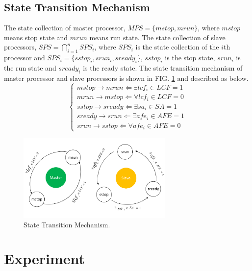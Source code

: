 \documentclass[journal,UTF8]{IEEEtran}
\begin{document}
 \subsection{State Transition Mechanism}
 The state collection of master processor, $MPS = \{mstop, mrun\}$, where $mstop$ means stop state and $mrun$ means run state. The state collection of slave processors, $SPS = \bigcap_{i=1}^{n} SPS_{i}$, where $SPS_{i}$ is the state collection of the $i$th processor and $SPS_{i} = \{sstop_{i}, srun_{i}, sready_{i}\}$, $sstop_{i}$ is the stop state, $srun_{i}$ is the run state and $sready_{i}$ is the ready state. The state transition mechanism of master processor and slave processors is shown in FIG. \ref{fig:state} and described as below.
\begin{equation}
\left\{
\begin{array}{l}
 mstop \to mrun \Leftarrow\exists lcf_i \in LCF = 1\\
 mrun \to mstop \Leftarrow\forall lcf_i \in LCF = 0\\
 sstop \to sready \Leftarrow\exists sa_{i} \in SA = 1\\
 sready \to srun \Leftarrow\exists afe_{i}\in AFE = 1\\
 srun \to sstop \Leftarrow\forall afe_{i}\in AFE = 0
\end{array}
\right.
\end{equation}

 \begin{figure}
	\centering
	\includegraphics[width=3in]{fig/state.pdf}
	\caption{ State Transition Mechanism.}
	\label{fig:state}
\end{figure}
\section{Experiment}
\label{Experiment}
\end{document}
